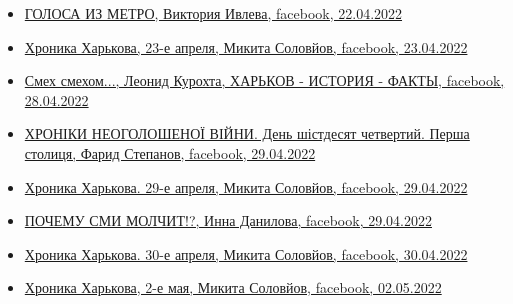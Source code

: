 \begin{itemize}
\item \hyperlink{22_04_2022.fb.ivleva_viktoria.moskva.ng.1.golosa_iz_metro}{%
ГОЛОСА ИЗ МЕТРО, Виктория Ивлева, facebook, 22.04.2022%
}

\item \hyperlink{23_04_2022.fb.solovjov_mikita.harkov.demsokyra.1.hronika}{%
Хроника Харькова, 23-е апреля, Микита Соловйов, facebook, 23.04.2022%
}

\item \hyperlink{28_04_2022.fb.fb_group.harkov_istoria_fakty.1.smeh_smehom}{%
Смех смехом..., Леонид Курохта, ХАРЬКОВ - ИСТОРИЯ - ФАКТЫ, facebook, 28.04.2022%
}

\item \hyperlink{29_04_2022.fb.fb_group.story_kiev_ua.1.hronika_harkov}{%
ХРОНІКИ НЕОГОЛОШЕНОЇ ВІЙНИ. День шістдесят четвертий. Перша столиця, Фарид Степанов, facebook, 29.04.2022%
}

\item \hyperlink{29_04_2022.fb.solovjov_mikita.harkov.demsokyra.1.hronika}{%
Хроника Харькова. 29-е апреля, Микита Соловйов, facebook, 29.04.2022%
}

\item \hyperlink{29_04_2022.fb.danilova_inna.harkov.1.smi_molchit}{%
ПОЧЕМУ СМИ МОЛЧИТ!?, Инна Данилова, facebook, 29.04.2022%
}

\item \hyperlink{30_04_2022.fb.solovjov_mikita.harkov.demsokyra.1.hronika}{%
Хроника Харькова. 30-е апреля, Микита Соловйов, facebook, 30.04.2022%
}

\item \hyperlink{02_05_2022.fb.solovjov_mikita.harkov.demsokyra.1.hronika}{%
Хроника Харькова, 2-е мая, Микита Соловйов, facebook, 02.05.2022%
}

\end{itemize} %

